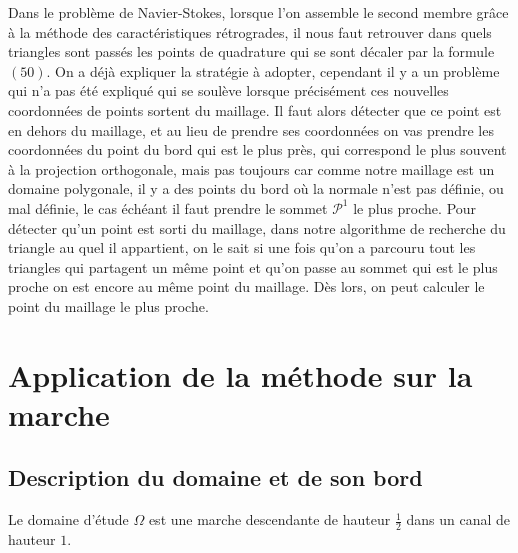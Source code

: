 \documentclass[a4paper,12pt]{article}
\begin{document}
Dans le problème de Navier-Stokes, lorsque l'on assemble le second membre grâce à la méthode des caractéristiques rétrogrades, il nous faut retrouver dans quels triangles sont passés les points de quadrature qui se sont décaler par la formule $(50)$. On a déjà expliquer la stratégie à adopter, cependant il y a un problème qui n'a pas été expliqué qui se soulève lorsque précisément ces nouvelles coordonnées de points sortent du maillage. Il faut alors détecter que ce point est en dehors du maillage, et au lieu de prendre ses coordonnées on vas prendre les coordonnées du point du bord qui est le plus près, qui correspond le plus souvent à la projection orthogonale, mais pas toujours car comme notre maillage est un domaine polygonale, il y a des points du bord où la normale n'est pas définie, ou mal définie, le cas échéant il faut prendre le sommet $\mathcal{P}^1$ le plus proche.
Pour détecter qu'un point est sorti du maillage, dans notre algorithme de recherche du triangle au quel il appartient, on le sait si une fois qu'on a parcouru tout les triangles qui partagent un même point et qu'on passe au sommet qui est le plus proche on est encore au même point du maillage. Dès lors, on peut calculer le point du maillage le plus proche.

\newpage

\section{Application de la méthode sur la marche}

\subsection{Description du domaine et de son bord}

Le domaine d'étude $\Omega$ est une marche descendante de hauteur $\frac{1}{2}$ dans un canal de hauteur $1$.
\end{document}
